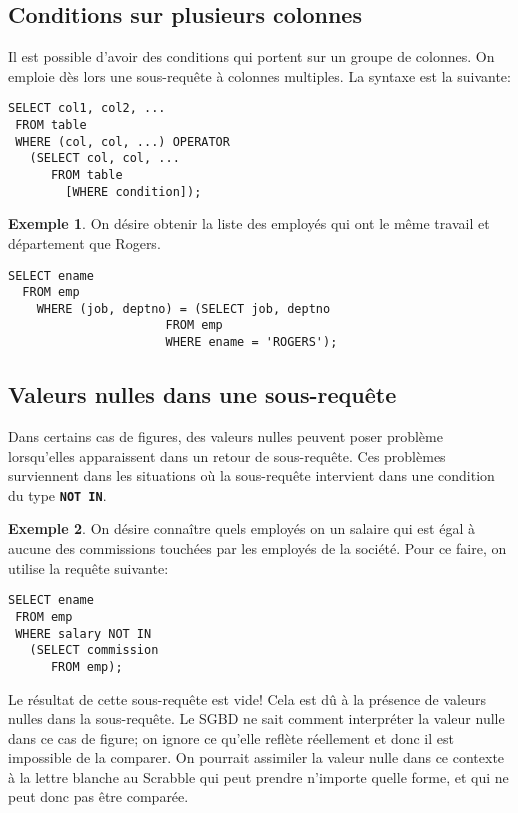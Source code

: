 \documentclass[a4paper, 12pt]{report}
\newcommand{\textSQL}[1]{\texttt{\textbf{#1}}}
\theoremstyle{definition} \newtheorem{ex}{Exemple}
\begin{document}
\subsection{Conditions sur plusieurs colonnes}
Il est possible d'avoir des conditions qui portent sur un groupe de colonnes. On emploie dès lors une sous-requête à colonnes multiples. La syntaxe est la suivante:
\begin{lstlisting}[frame=single]
SELECT col1, col2, ...
 FROM table
 WHERE (col, col, ...) OPERATOR
   (SELECT col, col, ...
	  FROM table
		[WHERE condition]);
\end{lstlisting}
\begin{ex}
On désire obtenir la liste des employés qui ont le même travail et département que Rogers.
	\begin{lstlisting}[frame=single]
SELECT ename
  FROM emp
	WHERE (job, deptno) = (SELECT job, deptno
		              FROM emp
		              WHERE ename = 'ROGERS');
	\end{lstlisting}
\end{ex}

\subsection{Valeurs nulles dans une sous-requête}
Dans certains cas de figures, des valeurs nulles peuvent poser problème lorsqu'elles apparaissent dans un retour de sous-requête. Ces problèmes surviennent dans les situations où la sous-requête intervient dans une condition du type \textSQL{NOT IN}.

\begin{ex}
On désire connaître quels employés on un salaire qui est égal à aucune des commissions touchées par les employés de la société. Pour ce faire, on utilise la requête suivante:
\begin{lstlisting}[frame=single]
SELECT ename
 FROM emp
 WHERE salary NOT IN
   (SELECT commission
	  FROM emp);
\end{lstlisting}

Le résultat de cette sous-requête est vide! Cela est dû à la présence de valeurs nulles dans la sous-requête. Le SGBD ne sait comment interpréter la valeur nulle dans ce cas de figure; on ignore ce qu'elle reflète réellement et donc il est impossible de la comparer. On pourrait assimiler la valeur nulle dans ce contexte à  la lettre blanche au Scrabble qui peut prendre n'importe quelle forme, et qui ne peut donc pas être comparée. 
\end{ex}
\end{document}
